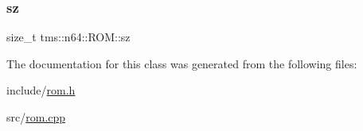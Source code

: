\mbox{\label{classtms_1_1n64_1_1_r_o_m_a8784387b5b9c8ac9b200e4efa0aa26cc}} 
\subsubsection{\texorpdfstring{sz}{sz}}
{\footnotesize\ttfamily size\+\_\+t tms\+::n64\+::\+R\+O\+M\+::sz\hspace{0.3cm}{\ttfamily [private]}}



The documentation for this class was generated from the following files\+:\begin{DoxyCompactItemize}
\item 
include/\hyperlink{rom_8h}{rom.\+h}\item 
src/\hyperlink{rom_8cpp}{rom.\+cpp}\end{DoxyCompactItemize}
